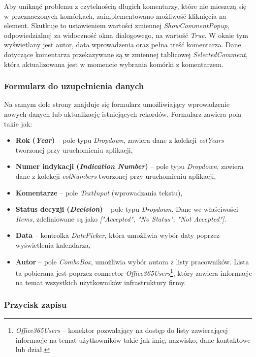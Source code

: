 Aby uniknąć problemu z czytelnością długich komentarzy, które nie mieszczą się w przeznaczonych komórkach, zaimplementowano możliwość kliknięcia na element. Skutkuje to ustawieniem wartości zmiennej \emph{ShowCommentPopup}, odpowiedzialnej za widoczność okna dialogowego, na wartość \emph{True}. W oknie tym wyświetlany jest autor, data wprowadzenia oraz pełna treść komentarza. Dane dotyczące komentarza przekazywane są w zmiennej tablicowej \emph{SelectedComment}, która aktualizowana jest w momencie wybrania komórki z komentarzem.

\subsubsection*{Formularz do uzupełnienia danych}

Na samym dole strony znajduje się formularz umożliwiający wprowadzenie nowych danych lub aktualizację istniejących rekordów. Formularz zawiera pola takie jak:
\begin{itemize}
    \item \textbf{Rok (\emph{Year})} -- pole typu \emph{Dropdown}, zawiera dane z kolekcji \emph{colYears} tworzonej przy uruchomieniu aplikacji,
    \item \textbf{Numer indykacji (\emph{Indication Number})} -- pole typu \emph{Dropdown}, zawiera dane z kolekcji \emph{colNumbers} tworzonej przy uruchomieniu aplikacji,
    \item \textbf{Komentarze} -- pole \emph{TextInput} (wprowadzania tekstu),
    \item \textbf{Status decyzji (\emph{Decision})} -- pole typu \emph{Dropdown}. Dane we właściwości \emph{Items}, zdefiniowane są jako \emph{["Accepted", "No Status", "Not Accepted"]}.
    \item \textbf{Data} -- kontrolka \emph{DatePicker}, która umożliwia wybór daty poprzez wyświetlenia kalendarza,
    \item \textbf{Autor} -- pole \emph{ComboBox}, umożliwia wybór autora z listy pracowników. Lista ta pobierana jest poprzez connector \emph{Office365Users}\footnote{\emph{Office365Users} -- konektor pozwalający na dostęp do listy zawierającej informacje na temat użytkowników takie jak imię, nazwisko, dane kontaktowe lub dział.}, który zawiera informacje na temat wszystkich użytkowników infrastruktury firmy.
\end{itemize}


\subsubsection*{Przycisk zapisu}


